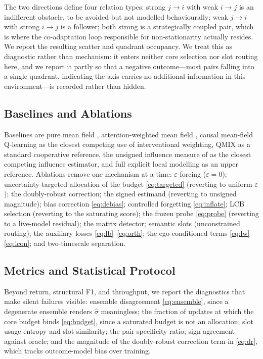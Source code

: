\documentclass[conference]{IEEEtran}
\begin{document}
The two directions define four relation types: strong $j\to i$ with weak $i\to j$ is an indifferent obstacle, to be avoided but not modelled behaviourally; weak $j\to i$ with strong $i\to j$ is a follower; both strong is a strategically coupled pair, which is where the co-adaptation loop responsible for non-stationarity actually resides. We report the resulting scatter and quadrant occupancy. We treat this as diagnostic rather than mechanism: it enters neither core selection nor slot routing here, and we report it partly so that a negative outcome---most pairs falling into a single quadrant, indicating the axis carries no additional information in this environment---is recorded rather than hidden.

\subsection{Baselines and Ablations}

Baselines are pure mean field \cite{yang2018mfmarl}, attention-weighted mean field \cite{hao2023gatmf}, causal mean-field Q-learning \cite{ma2023cmfq} as the closest competing use of interventional weighting, QMIX \cite{rashid2020qmix} as a standard cooperative reference, the unsigned influence measure of \cite{pieroth2024influence} as the closest competing influence estimator, and full explicit local modelling as an upper reference. Ablations remove one mechanism at a time: $\varepsilon$-forcing ($\varepsilon=0$); uncertainty-targeted allocation of the budget \eqref{eq:targeted} (reverting to uniform $\varepsilon$); the doubly-robust correction; the signed estimand (reverting to unsigned magnitude); bias correction \eqref{eq:debias}; controlled forgetting \eqref{eq:inflate}; LCB selection (reverting to the saturating score); the frozen probe \eqref{eq:probe} (reverting to a live-model residual); the matrix detector; semantic slots (unconstrained routing); the auxiliary losses \eqref{eq:lb}--\eqref{eq:orth}; the ego-conditioned terms \eqref{eq:lw}--\eqref{eq:lcon}; and two-timescale separation.

\subsection{Metrics and Statistical Protocol}

Beyond return, structural F1, and throughput, we report the diagnostics that make silent failures visible: ensemble disagreement \eqref{eq:ensemble}, since a degenerate ensemble renders $\hat\sigma$ meaningless; the fraction of updates at which the core budget binds \eqref{eq:budget}, since a saturated budget is not an allocation; slot usage entropy and slot similarity; the pair-specificity ratio; sign agreement against oracle; and the magnitude of the doubly-robust correction term in \eqref{eq:dr}, which tracks outcome-model bias over training.
\end{document}
